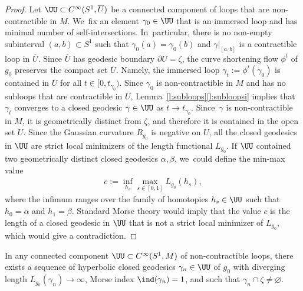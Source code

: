 \begin{proof}
Let $\UU\subset C^\infty(S^1,\overline U)$ be a connected component of loops that are non-con\-tractible in $M$. We~fix an element $\gamma_0\in\UU$ that is an immersed loop and has minimal number of self-intersections. In~particular, there is no non-empty subinterval $(a,b)\subset S^1$ such that $\gamma_0(a)=\gamma_0(b)$ and $\gamma|_{[a,b]}$ is a contractible loop in $\overline U$. Since $\overline U$ has geodesic boundary $\partial U=\zeta$, the curve shortening flow $\phi^t$ of $g_0$ preserves the compact set $\overline U$. Namely, the immersed loop $\gamma_t:=\phi^t(\gamma_0)$ is contained in $\overline U$ for all $t\in[0,t_{\gamma_0})$. Since $\gamma_0$ is non-contractible in $M$ and has no subloops that are contractible in $\overline U$, Lemma~\ref{l:subloops}\eqref{l:subloopsi} implies that $\gamma_t$ converges to a closed geodesic $\gamma\in\UU$ as $t\to t_{\gamma_0}$.
Since~$\gamma$ is non-contractible in $M$, it is geometrically distinct from $\zeta$, and therefore it is contained in the open set $U$.
Since the Gaussian curvature $R_{g_0}$ is negative on $U$, all the closed geodesics in $\UU$ are strict local minimizers of the length functional $L_{g_0}$.
If $\UU$ contained two geometrically distinct closed geodesics $\alpha,\beta$, we~could define the min-max value
\begin{align*}
c:=\inf_{h_s} \max_{s\in[0,1]} L_{g_0}(h_s),
\end{align*}
where the infimum ranges over the family of homotopies $h_s\in\UU$ such that $h_0=\alpha$ and $h_1=\beta$. Standard Morse theory would imply that the value $c$ is the length of a closed geodesic in $\UU$ that is not a strict local minimizer of $L_{g_0}$, which would give a contradiction.
\end{proof}

\begin{Lemma}\label{l:infinitely_many_Donnay}
In any connected component $\UU\subset C^\infty(S^1,M)$ of non-contractible loops, there exists a sequence of hyperbolic closed geodesics $\gamma_n\in\UU$ of $g_0$ with diverging length $L_{g_0}(\gamma_n)\to\infty$, Morse index $\ind(\gamma_n)=1$, and such that $\gamma_n\cap\zeta\neq\varnothing$.
\end{Lemma}

